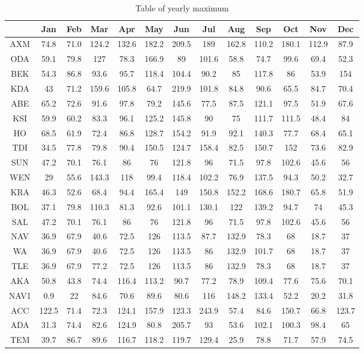 \documentclass{article}
\begin{document}
	\begin{table}[H]
		\centering
		\begin{tabular}{|c| c c c c c c c c c c c c|} 
			\hline
			& Jan & Feb & Mar & Apr & May & Jun & Jul & Aug & Sep & Oct & Nov & Dec \\ 
			\hline\hline
			AXM & 74.8 & 71.0 & 124.2 & 132.6 & 182.2 & 209.5 & 189 & 162.8 & 110.2 & 180.1 & 112.9 & 87.9 \\
			ODA & 59.1 & 79.8 & 127 & 78.3 & 166.9 & 89 & 101.6 & 58.8 & 74.7 & 99.6 & 69.4 & 52.3 \\
			BEK & 54.3 & 86.8 & 93.6 & 95.7 & 118.4 & 104.4 & 90.2 & 85 & 117.8 & 86 & 53.9 & 154 \\
			KDA & 43 & 71.2 & 159.6 & 105.8 & 64.7 & 219.9 & 101.8 & 84.8 & 90.6 & 65.5 & 84.7 & 70.4 \\
			ABE & 65.2 & 72.6 & 91.6 & 97.8 & 79.2 & 145.6 & 77.5 & 87.5 & 121.1 & 97.5 & 51.9 & 67.6 \\
			KSI & 59.9 & 60.2 & 83.3 &  96.1 & 125.2 & 145.8 & 90 & 75 & 111.7 & 111.5 & 48.4 & 84 \\
			HO & 68.5 & 61.9 & 72.4 & 86.8 & 128.7 &  154.2 & 91.9 & 92.1 & 140.3 & 77.7 & 68.4 & 65.1 \\
			TDI & 34.5 & 77.8 & 79.8 & 90.4 & 150.5 & 124.7 & 158.4 & 82.5 & 150.7 & 152 & 73.6 & 82.9 \\
			SUN & 47.2 & 70.1 & 76.1 & 86 & 76 & 121.8 & 96 & 71.5 & 97.8 & 102.6 & 45.6 & 56 \\
			WEN & 29 & 55.6 & 143.3 & 118 & 99.4 & 118.4 & 102.2 & 76.9 & 137.5 & 94.3 & 50.2 & 32.7 \\
			KRA & 46.3 & 52.6 & 68.4 & 94.4 & 165.4 & 149 & 150.8 & 152.2 & 168.6 & 180.7 & 65.8 & 51.9 \\
			BOL & 37.1 & 79.8 & 110.3 & 81.3 & 92.6 & 101.1 & 130.1 & 122 & 139.2 & 94.7 & 74 & 45.3 \\
			SAL & 47.2 & 70.1 & 76.1 & 86 & 76 & 121.8 & 96 & 71.5 & 97.8 & 102.6 & 45.6 & 56 \\
			NAV & 36.9 & 67.9 & 40.6 & 72.5 & 126 & 113.5 & 87.7 & 132.9 & 78.3 & 68 & 18.7 & 37 \\
			WA & 36.9 & 67.9 & 40.6 & 72.5 & 126 & 113.5 & 86 & 132.9 & 101.7 & 68 & 18.7 & 37 \\
			TLE & 36.9 & 67.9 & 77.2 & 72.5 & 126 & 113.5 & 86 & 132.9 & 78.3 & 68 & 18.7 & 37 \\
			AKA & 50.8 & 43.8 & 74.4 & 116.4 & 113.2 & 90.7 & 77.2 & 78.9 & 109.4 & 77.6 & 75.6 & 70.1 \\
			NAV1 & 0.9 & 22 & 84.6 & 70.6 & 89.6 & 80.6 & 116 & 148.2 & 133.4 & 52.2 & 20.2 & 31.8 \\
			ACC & 122.5 & 71.4 & 72.3 & 124.1 & 157.9 & 123.3 & 243.9 & 57.4 & 84.6 & 150.7 & 66.8 & 123.7 \\
			ADA & 31.3 & 74.4 & 82.6 & 124.9 & 80.8 &  205.7 & 93 & 53.6& 102.1 & 100.3 & 98.4 & 65 \\ 
			TEM & 39.7 & 86.7 & 89.6 & 116.7 & 118.2 & 119.7 & 129.4 & 25.9 & 78.8 & 71.7 & 57.9 & 74.5 \\
			\hline
		\end{tabular}
		\caption{Table of yearly maximum}
		\label{tableymax}
	\end{table}	
\end{document}

